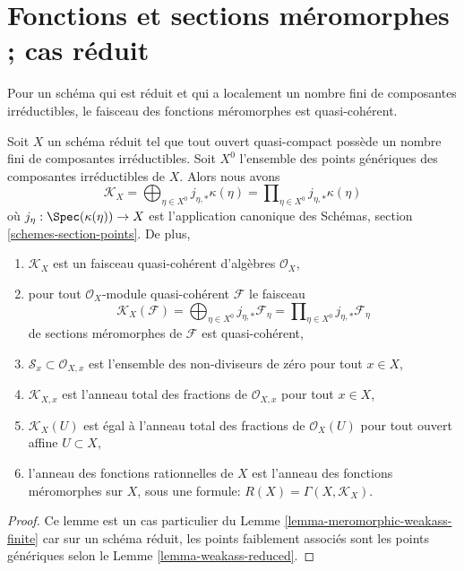 \section{Fonctions et sections méromorphes ; cas réduit}
\label{section-meromorphic-reduced}

\noindent
Pour un schéma qui est réduit et qui a localement un nombre fini de composantes
irréductibles, le faisceau des fonctions méromorphes est quasi-cohérent.

\begin{lemma}
\label{lemma-reduced-finite-irreducible}
Soit  $X$  un schéma réduit tel que tout ouvert quasi-compact possède un
nombre fini de composantes irréductibles. Soit  $X^0$  l'ensemble des points
génériques des composantes irréductibles de  $X$. Alors nous avons
$$
\mathcal{K}_X =
\bigoplus\nolimits_{\eta \in X^0} j_{\eta, *}\kappa(\eta) =
\prod\nolimits_{\eta \in X^0} j_{\eta, *}\kappa(\eta)
$$
où  $j_\eta : \Spec(\kappa(\eta)) \to X$  est l'application canonique des Schémas, section  \ref{schemes-section-points}. De
plus,
\begin{enumerate}
\item $\mathcal{K}_X$  est un faisceau quasi-cohérent d'algèbres  $\mathcal{O}_X$,
\item pour tout  $\mathcal{O}_X$-module quasi-cohérent  $\mathcal{F}$  le faisceau
$$
\mathcal{K}_X(\mathcal{F}) =
\bigoplus\nolimits_{\eta \in X^0} j_{\eta, *}\mathcal{F}_\eta =
\prod\nolimits_{\eta \in X^0} j_{\eta, *}\mathcal{F}_\eta
$$
de sections méromorphes de  $\mathcal{F}$  est quasi-cohérent,
\item $\mathcal{S}_x \subset \mathcal{O}_{X, x}$  est l'ensemble des non-diviseurs de zéro pour tout  $x \in X$,
\item $\mathcal{K}_{X, x}$  est l'anneau total des fractions de  $\mathcal{O}_{X, x}$  pour tout
 $x \in X$,
\item $\mathcal{K}_X(U)$  est égal à l'anneau total des fractions de  $\mathcal{O}_X(U)$  pour tout
ouvert affine  $U \subset X$,
\item l'anneau des fonctions rationnelles de  $X$  est l'anneau des fonctions
méromorphes sur  $X$, sous une formule:  $R(X) = \Gamma(X, \mathcal{K}_X)$.
\end{enumerate}
\end{lemma}

\begin{proof}
Ce lemme est un cas particulier du Lemme  \ref{lemma-meromorphic-weakass-finite}  car sur un schéma réduit,
les points faiblement associés sont les points génériques selon le Lemme
 \ref{lemma-weakass-reduced}.
\end{proof}

